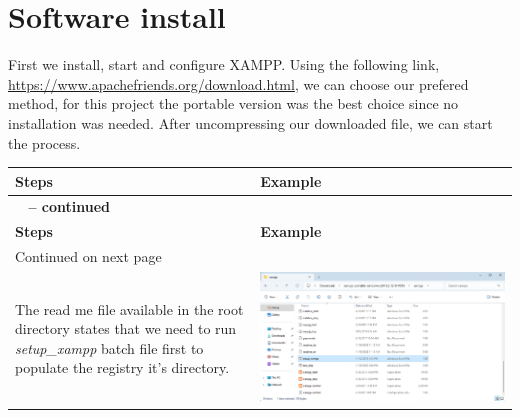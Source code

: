\documentclass[11pt,a4paper]{report}
\begin{document}
    \section{Software install}
        \begin{flushleft}
            First we install, start and configure XAMPP. Using the following link, \href{https://www.apachefriends.org/download.html}{https://www.apachefriends.org/download.html}, we can choose our prefered method, for this project the portable version was the best choice since no installation was needed. After uncompressing our downloaded file, we can start the process.
                \begin{center}
                    \begin{longtable}{ m{5cm} l }
                        \textbf{Steps} & \textbf{Example} \\
                        \hline
                        \endfirsthead
                        {{\bfseries \tablename\ \thetable{} -- continued}} \\
                        \textbf{Steps} & \textbf{Example} \\
                        \hline
                        \endhead
                        \hline Continued on next page \\
                        \endfoot
                        \endlastfoot

                        The read me file available in the root directory states that we need to run \textit{setup\_xampp} batch file first to populate the registry it's directory.
                        & \includegraphics[scale=0.35,valign=c]{install_xampp08} \\
                        \hline
                        

\end{longtable}
\end{center}
\end{flushleft}
\end{document}
